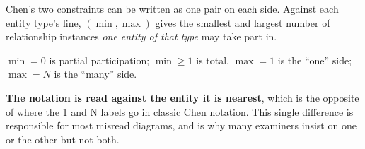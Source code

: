 \begin{definitionbox}
Chen's two constraints can be written as one pair on each side. Against each
entity type's line, $(\min,\max)$ gives the smallest and largest number of
relationship instances \emph{one entity of that type} may take part in.

\smallskip
$\min = 0$ is partial participation; $\min \ge 1$ is total. $\max = 1$ is the
``one'' side; $\max = N$ is the ``many'' side.

\smallskip
\textbf{The notation is read against the entity it is nearest}, which is the
opposite of where the 1 and N labels go in classic Chen notation. This single
difference is responsible for most misread diagrams, and is why many
examiners insist on one or the other but not both.
\end{definitionbox}

